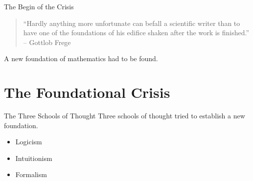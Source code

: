 \documentclass{beamer}
\begin{document}
\begin{frame}{The Begin of the Crisis}
\begin{quote}
	``Hardly anything more unfortunate can befall a scientific writer than to have one of the foundations of his edifice shaken after the work is finished.''\nocite{frege_appendix}\\\hfill-- Gottlob Frege
\end{quote}
	\pause
	\centerline{\alert{A new foundation of mathematics had to be found.}}
\end{frame}
\section{The Foundational Crisis}
\begin{frame}{The Three Schools of Thought}
Three schools of thought tried to establish a new foundation.
\begin{itemize}
	\item Logicism
	\item Intuitionism
	\item Formalism
\end{itemize}
\vspace{.5\baselineskip}
\end{frame}
\end{document}
